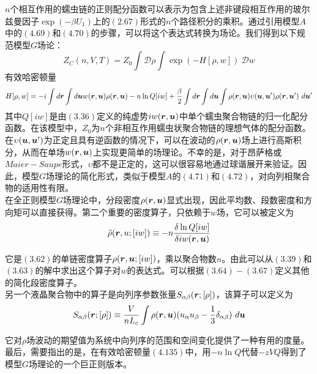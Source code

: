 $n$个相互作用的蠕虫链的正则配分函数可以表示为包含上述非键段相互作用的玻尔兹曼因子$\exp (-\beta U_1)$上的$(2.67)$形式的$n$个路径积分的乘积。通过引用模型$A$中的$(4.69)$和$(4.70)$的步骤，可以将这个表达式转换为场论。我们得到以下规范模型$G$场论：\\
\begin{equation}
Z_{C}(n,V,T)=Z_{0} \int \mathcal{D} \rho \int  \exp (-H[\rho,w])~\mathcal{D} w
\end{equation}
有效哈密顿量\\ 
\begin{equation}
H[\rho,w]= -i \int d\bm{r} \int d\bm{u} w(\bm{r},\bm{u}) \rho(\bm{r},\bm{u})-n \ln Q[i w]+\frac{\beta}{2} \int d\bm{r} \int d\bm{u} \int  \rho(\bm{r},\bm{u}) \upsilon(\bm{u},\bm{u}') \rho(\bm{r},\bm{u}')~d\bm{u}'
\end{equation}
其中$Q[i w]$是由$(3.36)$定义的纯虚势$i w(\bm{r},\bm{u})$中单个蠕虫聚合物链的归一化配分函数。在该模型中，$Z_0$为$n$个非相互作用蠕虫状聚合物链的理想气体的配分函数。\\

在$\upsilon(\bm{u},\bm{u}')$为正定且具有逆函数的情况下，可以在波动的$\rho(\bm{r},\bm{u})$场上进行高斯积分，从而在单场$w(\bm{r},\bm{u})$上实现更简单的场理论。不幸的是，对于昂萨格或$Maier-Saupe$形式，$\upsilon$都不是正定的，这可以很容易地通过球谐展开来验证。因此，模型$G$场理论的简化形式，类似于模型$A$的$(4.71)$和$(4.72)$，对向列相聚合物的适用性有限。\\

在全正则模型$G$场理论中，分段密度$\rho(\bm{r},\bm{u})$显式出现，因此平均数、段数密度和方向矩可以直接获得。第二个重要的密度算子，只依赖于$w$场，它可以被定义为\\
\begin{equation}
\tilde{\rho}(\bm{r},u;[i w]) \equiv -n \frac{\delta \ln Q[i w]}{\delta i w(\bm{r},\bm{u})}
\end{equation}

它是$(3.62)$的单链密度算子$\rho(\bm{r},\bm{u};[i w])$，乘以聚合物数$n$。由此可以从$(3.39)$和$(3.63)$的解中求出这个算子对$w$的表达式。可以根据$(3.64)-(3.67)$定义其他的简化段密度算子。\\

另一个液晶聚合物中的算子是向列序参数张量$S_{\alpha \beta}(\bm{r};[\rho])$，该算子可以定义为\\
\begin{equation}
S_{\alpha \beta}(\bm{r};[\rho]) \equiv \frac{V}{n L_{c}} \int \rho(\bm{r},\bm{u})(u_{\alpha} u_{\beta}-\frac{1}{3} \delta_{\alpha \beta})~d\bm{u}
\end{equation}

它对$\rho$场波动的期望值为系统中向列序的范围和空间变化提供了一种有用的度量。最后，需要指出的是，在有效哈密顿量$(4.135)$中，用$-n \ln Q$代替$-z VQ$得到了模型$G$场理论的一个巨正则版本。\\
